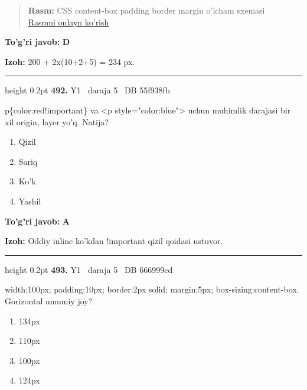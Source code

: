 \documentclass[10pt,a4paper,oneside]{article}
\begin{document}
\begin{quote}\footnotesize\color{muted}\textbf{Rasm:} CSS content-box padding border margin o'lcham sxemasi\\
\href{https://github.com/sarvar9417/attestatsiya/blob/main/public/graphics-web-v2/css_box.svg}{Rasmni onlayn ko'rish}
\end{quote}
\begin{tcolorbox}[enhanced,breakable,colback=teal!4,colframe=teal!45!black,boxrule=0.45pt,arc=1.2mm,left=2.8mm,right=2.8mm,top=2mm,bottom=2mm,before skip=2mm,after skip=2mm]
\textbf{\color{teal}To'g'ri javob:} \textbf{D}
\par\smallskip
\textbf{Izoh:} 200 + 2x(10+2+5) = 234 px.
\end{tcolorbox}
\vspace{2mm}\hrule height 0.2pt \vspace{4mm}
\hypertarget{q492}{\textbf{\color{ink}492.}}  {\color{muted}\scriptsize Y1 \textbullet\ daraja 5 \textbullet\ DB 55f938fb}
\par
p\{color:red!important\} va \textless{}p style="color:blue"\textgreater{} uchun muhimlik darajasi bir xil origin, layer yo'q. Natija?
\begin{enumerate}[label=\Alph*),leftmargin=9mm]
\item Qizil
\item Sariq
\item Ko'k
\item Yashil
\end{enumerate}
\begin{tcolorbox}[enhanced,breakable,colback=teal!4,colframe=teal!45!black,boxrule=0.45pt,arc=1.2mm,left=2.8mm,right=2.8mm,top=2mm,bottom=2mm,before skip=2mm,after skip=2mm]
\textbf{\color{teal}To'g'ri javob:} \textbf{A}
\par\smallskip
\textbf{Izoh:} Oddiy inline ko'kdan !important qizil qoidasi ustuvor.
\end{tcolorbox}
\vspace{2mm}\hrule height 0.2pt \vspace{4mm}
\hypertarget{q493}{\textbf{\color{ink}493.}}  {\color{muted}\scriptsize Y1 \textbullet\ daraja 5 \textbullet\ DB 666999cd}
\par
width:100px; padding:10px; border:2px solid; margin:5px; box-sizing:content-box. Gorizontal umumiy joy?
\begin{enumerate}[label=\Alph*),leftmargin=9mm]
\item 134px
\item 110px
\item 100px
\item 124px
\end{enumerate}
\end{document}
